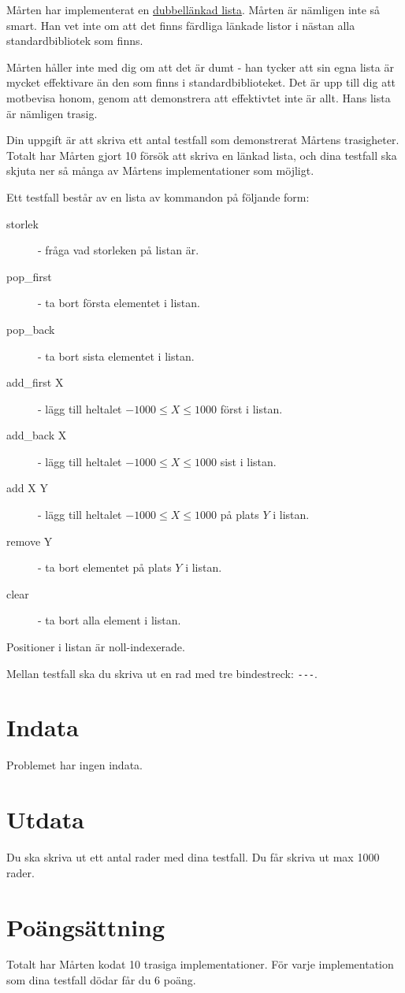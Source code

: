 
Mårten har implementerat en \href{https://en.wikipedia.org/wiki/Doubly\_linked\_list}{dubbellänkad lista}. Mårten är nämligen inte så smart. Han vet inte om att det finns färdliga länkade listor i nästan alla standardbibliotek som finns.

Mårten håller inte med dig om att det är dumt - han tycker att sin egna lista är mycket effektivare än den som finns i standardbiblioteket. Det är upp till dig att motbevisa honom, genom att demonstrera att effektivtet inte är allt. Hans lista är nämligen trasig.

Din uppgift är att skriva ett antal testfall som demonstrerat Mårtens trasigheter. Totalt har Mårten gjort 10 försök att skriva en länkad lista, och dina testfall ska skjuta ner så många av Mårtens implementationer som möjligt.

Ett testfall består av en lista av kommandon på följande form:
\begin{description}
	\item[storlek] - fråga vad storleken på listan är.
	\item[pop\_first] - ta bort första elementet i listan.
	\item[pop\_back] - ta bort sista elementet i listan.
	\item[add\_first X] - lägg till heltalet $-1000 \le X \le 1000$ först i listan.
	\item[add\_back X] - lägg till heltalet $-1000 \le X \le 1000$ sist i listan.
	\item[add X Y] - lägg till heltalet $-1000 \le X \le 1000$ på plats $Y$ i listan.
	\item[remove Y] - ta bort elementet på plats $Y$ i listan.
	\item[clear] - ta bort alla element i listan.
\end{description}
Positioner i listan är noll-indexerade. 

Mellan testfall ska du skriva ut en rad med tre bindestreck: \texttt{-{}-{}-}.

\section*{Indata}
Problemet har ingen indata.

\section*{Utdata}
Du ska skriva ut ett antal rader med dina testfall. Du får skriva ut max 1000 rader.

\section*{Poängsättning}
Totalt har Mårten kodat 10 trasiga implementationer. För varje implementation som dina testfall dödar får du 6 poäng.
